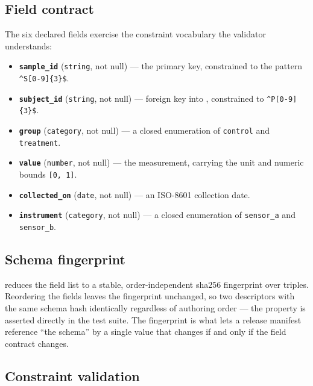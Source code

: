 \documentclass[
]{article}
\providecommand{\tightlist}{%
  \setlength{\itemsep}{0pt}\setlength{\parskip}{0pt}}
\begin{document}
\subsection{Field contract}\label{field-contract}

The six declared fields exercise the constraint vocabulary the validator
understands:

\begin{itemize}
\tightlist
\item
  \textbf{\texttt{sample\_id}} (\texttt{string}, not null) --- the
  primary key, constrained to the pattern
  \texttt{\^{}S{[}0-9{]}\{3\}\$}.
\item
  \textbf{\texttt{subject\_id}} (\texttt{string}, not null) --- foreign
  key into , constrained to
  \texttt{\^{}P{[}0-9{]}\{3\}\$}.
\item
  \textbf{\texttt{group}} (\texttt{category}, not null) --- a closed
  enumeration of \texttt{control} and \texttt{treatment}.
\item
  \textbf{\texttt{value}} (\texttt{number}, not null) --- the
  measurement, carrying the unit  and numeric
  bounds \texttt{{[}0,\ 1{]}}.
\item
  \textbf{\texttt{collected\_on}} (\texttt{date}, not null) --- an
  ISO-8601 collection date.
\item
  \textbf{\texttt{instrument}} (\texttt{category}, not null) --- a
  closed enumeration of \texttt{sensor\_a} and \texttt{sensor\_b}.
\end{itemize}

\subsection{Schema fingerprint}\label{schema-fingerprint}

 reduces the field list to a stable,
order-independent sha256 fingerprint over
 triples. Reordering the fields leaves
the fingerprint unchanged, so two descriptors with the same schema hash
identically regardless of authoring order --- the property is asserted
directly in the test suite. The fingerprint is what lets a release
manifest reference ``the schema'' by a single value that changes if and
only if the field contract changes.

\subsection{Constraint validation}\label{constraint-validation}
\end{document}

